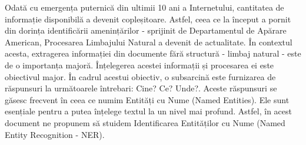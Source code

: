 
Odată cu emergența puternică din ultimii 10 ani a Internetului, cantitatea de informație disponibilă a devenit copleșitoare. Astfel, ceea ce la început a pornit din dorința identificării amenințărilor - sprijinit de Departamentul de Apărare American, Procesarea Limbajului Natural a devenit de actualitate. În contextul acesta, extragerea informației din documente fără structură - limbaj natural - este de o importanța majoră. Înțelegerea acestei informații și procesarea ei este obiectivul major. În cadrul acestui obiectiv, o subsarcină este furnizarea de răspunsuri la următoarele întrebari: Cine? Ce? Unde?. Aceste răspunsuri se găsesc frecvent în ceea ce numim Entități cu Nume (Named Entities). Ele sunt esențiale pentru a putea înțelege textul la un nivel mai profund. Astfel, în acest document ne propunem să stuidem Identificarea Entităților cu Nume (Named Entity Recognition - NER).
